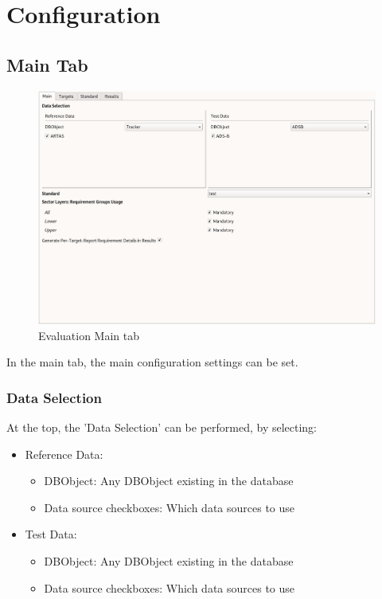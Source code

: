 \section{Configuration}
\label{sec:eval_config} 

\subsection{Main Tab}

\begin{figure}[H]
  \hspace*{-2cm}
    \includegraphics[width=18cm,frame]{../screenshots/eval_main.png}
  \caption{Evaluation Main tab}
\end{figure}

In the main tab, the main configuration settings can be set. \\

\subsubsection{Data Selection}

At the top, the 'Data Selection' can be performed, by selecting:
\begin{itemize}  
\item Reference Data:
\begin{itemize}  
\item DBObject: Any DBObject existing in the database
\item Data source checkboxes: Which data sources to use
\end{itemize}
\item Test Data:
\begin{itemize}  
\item DBObject: Any DBObject existing in the database
\item Data source checkboxes: Which data sources to use
\end{itemize}
\end{itemize}
\ \\


